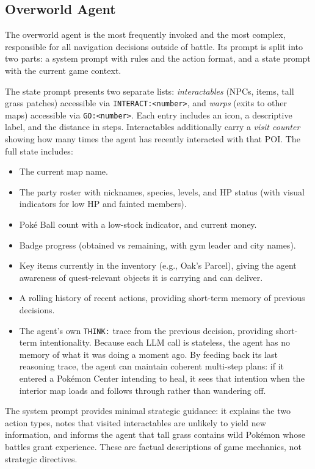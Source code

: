 \documentclass{article}
\begin{document}
\subsection{Overworld Agent}

The overworld agent is the most frequently invoked and the most complex, responsible for all navigation decisions outside of battle. Its prompt is split into two parts: a system prompt with rules and the action format, and a state prompt with the current game context.

The state prompt presents two separate lists: \emph{interactables} (NPCs, items, tall grass patches) accessible via \texttt{INTERACT:<number>}, and \emph{warps} (exits to other maps) accessible via \texttt{GO:<number>}. Each entry includes an icon, a descriptive label, and the distance in steps. Interactables additionally carry a \emph{visit counter} showing how many times the agent has recently interacted with that POI. The full state includes:

\begin{itemize}
  \item The current map name.
  \item The party roster with nicknames, species, levels, and HP status (with visual indicators for low HP and fainted members).
  \item Pok\'{e} Ball count with a low-stock indicator, and current money.
  \item Badge progress (obtained vs remaining, with gym leader and city names).
  \item Key items currently in the inventory (e.g., Oak's Parcel), giving the agent awareness of quest-relevant objects it is carrying and can deliver.
  \item A rolling history of recent actions, providing short-term memory of previous decisions.
  \item The agent's own \texttt{THINK:} trace from the previous decision, providing short-term intentionality. Because each LLM call is stateless, the agent has no memory of what it was doing a moment ago. By feeding back its last reasoning trace, the agent can maintain coherent multi-step plans: if it entered a Pok\'{e}mon Center intending to heal, it sees that intention when the interior map loads and follows through rather than wandering off.
\end{itemize}

The system prompt provides minimal strategic guidance: it explains the two action types, notes that visited interactables are unlikely to yield new information, and informs the agent that tall grass contains wild Pok\'{e}mon whose battles grant experience. These are factual descriptions of game mechanics, not strategic directives.
\end{document}

